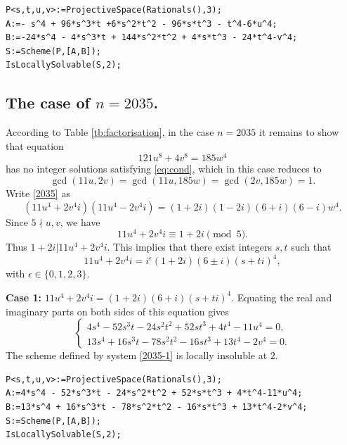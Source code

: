 \documentclass[a4paper,12pt,english,reqno]{amsart}
\begin{document}
\begin{lstlisting}
P<s,t,u,v>:=ProjectiveSpace(Rationals(),3);
A:=- s^4 + 96*s^3*t +6*s^2*t^2 - 96*s*t^3 - t^4-6*u^4;
B:=-24*s^4 - 4*s^3*t + 144*s^2*t^2 + 4*s*t^3 - 24*t^4-v^4;
S:=Scheme(P,[A,B]);
IsLocallySolvable(S,2);
\end{lstlisting}

\subsection{The case of $n=2035$.}%

According to Table \ref{tb:factorisation}, in the case $n=2035$ it remains to
show that equation
\begin{equation}\label{2035}
121 u^8 + 4 v^8=185  w^4
\end{equation}
has no integer solutions satisfying \eqref{eq:cond}, which in this case reduces to \[\gcd(11u,2v)=\gcd(11u,185w)=\gcd(2v,185w)=1.\]   Write \eqref{2035} as
\begin{equation} (11u^4+2v^4i)(11u^4-2v^4i)=(1+2i)(1-2i)(6+i)(6-i)w^4.
\end{equation}
Since $5\nmid u,v$, we have \[11u^4+2v^4i\equiv 1+2i\pmod{5}.\]
Thus $1+2i|11u^4+2v^4i$. This implies that there exist integers $s,t$ such that 
\[11u^4+2v^4i=i^{\epsilon}(1+2i)(6\pm i)(s+ti)^4,\]
with $\epsilon \in \{0,1,2,3\}$.


{\bf Case 1:} $11u^4+2v^4i=(1+2i)(6+i)(s+ti)^4$. Equating the real and imaginary parts on both sides of this equation gives
\begin{equation}\label{2035-1}
\begin{cases}
4s^4 - 52s^3t - 24s^2t^2 + 52st^3 + 4t^4 - 11u^4=0,\\
13s^4 + 16s^3t - 78s^2t^2 - 16st^3 + 13t^4 - 2v^4=0.
\end{cases}
\end{equation}
The scheme defined by system \eqref{2035-1} is locally insoluble at $2$.


\begin{lstlisting}
P<s,t,u,v>:=ProjectiveSpace(Rationals(),3);
A:=4*s^4 - 52*s^3*t - 24*s^2*t^2 + 52*s*t^3 + 4*t^4-11*u^4;
B:=13*s^4 + 16*s^3*t - 78*s^2*t^2 - 16*s*t^3 + 13*t^4-2*v^4;
S:=Scheme(P,[A,B]);
IsLocallySolvable(S,2);
\end{lstlisting}
\end{document}
